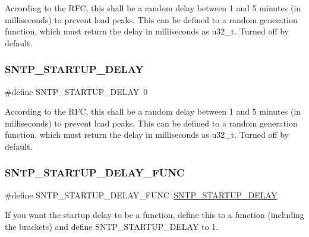 According to the R\+FC, this shall be a random delay between 1 and 5 minutes (in milliseconds) to prevent load peaks. This can be defined to a random generation function, which must return the delay in milliseconds as u32\+\_\+t. Turned off by default. \mbox{\label{group__sntp__opts_ga22017d43da7d4bf8d42e786b4ced4dfa}} 
\subsubsection{\texorpdfstring{S\+N\+T\+P\+\_\+\+S\+T\+A\+R\+T\+U\+P\+\_\+\+D\+E\+L\+AY}{SNTP\_STARTUP\_DELAY}\hspace{0.1cm}{\footnotesize\ttfamily [2/2]}}
{\footnotesize\ttfamily \#define S\+N\+T\+P\+\_\+\+S\+T\+A\+R\+T\+U\+P\+\_\+\+D\+E\+L\+AY~0}

According to the R\+FC, this shall be a random delay between 1 and 5 minutes (in milliseconds) to prevent load peaks. This can be defined to a random generation function, which must return the delay in milliseconds as u32\+\_\+t. Turned off by default. \mbox{\label{group__sntp__opts_gae082c2f3044d500ca5e1be1d4928de75}} 
\subsubsection{\texorpdfstring{S\+N\+T\+P\+\_\+\+S\+T\+A\+R\+T\+U\+P\+\_\+\+D\+E\+L\+A\+Y\+\_\+\+F\+U\+NC}{SNTP\_STARTUP\_DELAY\_FUNC}\hspace{0.1cm}{\footnotesize\ttfamily [1/2]}}
{\footnotesize\ttfamily \#define S\+N\+T\+P\+\_\+\+S\+T\+A\+R\+T\+U\+P\+\_\+\+D\+E\+L\+A\+Y\+\_\+\+F\+U\+NC~\hyperlink{group__sntp__opts_ga22017d43da7d4bf8d42e786b4ced4dfa}{S\+N\+T\+P\+\_\+\+S\+T\+A\+R\+T\+U\+P\+\_\+\+D\+E\+L\+AY}}

If you want the startup delay to be a function, define this to a function (including the brackets) and define S\+N\+T\+P\+\_\+\+S\+T\+A\+R\+T\+U\+P\+\_\+\+D\+E\+L\+AY to 1. \mbox{\label{group__sntp__opts_gae082c2f3044d500ca5e1be1d4928de75}} 
